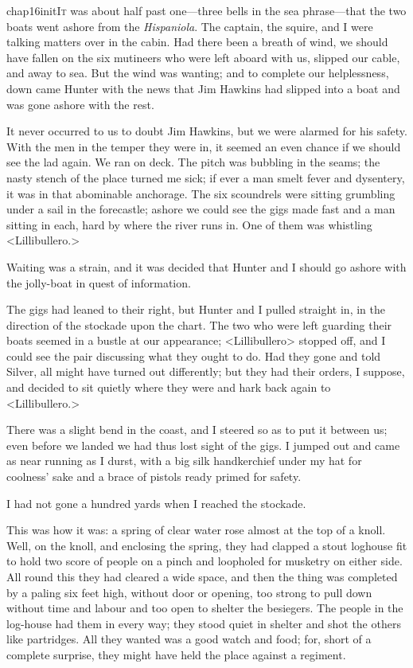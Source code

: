 
\lettrine{chap16initI}{t} was about half past one—three bells in the sea phrase—that the two boats went ashore from the \textit{Hispaniola}. The captain, the squire, and I were talking matters over in the cabin. Had there been a breath of wind, we should have fallen on the six mutineers who were left aboard with us, slipped our cable, and away to sea. But the wind was wanting; and to complete our helplessness, down came Hunter with the news that Jim Hawkins had slipped into a boat and was gone ashore with the rest.

It never occurred to us to doubt Jim Hawkins, but we were alarmed for his safety. With the men in the temper they were in, it seemed an even chance if we should see the lad again. We ran on deck. The pitch was bubbling in the seams; the nasty stench of the place turned me sick; if ever a man smelt fever and dysentery, it was in that abominable anchorage. The six scoundrels were sitting grumbling under a sail in the forecastle; ashore we could see the gigs made fast and a man sitting in each, hard by where the river runs in. One of them was whistling <Lillibullero.>

Waiting was a strain, and it was decided that Hunter and I should go ashore with the jolly-boat in quest of information.

The gigs had leaned to their right, but Hunter and I pulled straight in, in the direction of the stockade upon the chart. The two who were left guarding their boats seemed in a bustle at our appearance; <Lillibullero> stopped off, and I could see the pair discussing what they ought to do. Had they gone and told Silver, all might have turned out differently; but they had their orders, I suppose, and decided to sit quietly where they were and hark back again to <Lillibullero.>

There was a slight bend in the coast, and I steered so as to put it between us; even before we landed we had thus lost sight of the gigs. I jumped out and came as near running as I durst, with a big silk handkerchief under my hat for coolness' sake and a brace of pistols ready primed for safety.

I had not gone a hundred yards when I reached the stockade.

This was how it was: a spring of clear water rose almost at the top of a knoll. Well, on the knoll, and enclosing the spring, they had clapped a stout loghouse fit to hold two score of people on a pinch and loopholed for musketry on either side. All round this they had cleared a wide space, and then the thing was completed by a paling six feet high, without door or opening, too strong to pull down without time and labour and too open to shelter the besiegers. The people in the log-house had them in every way; they stood quiet in shelter and shot the others like partridges. All they wanted was a good watch and food; for, short of a complete surprise, they might have held the place against a regiment.

